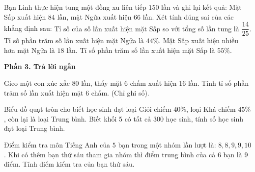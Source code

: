 \begin{ex} %
Bạn Linh thực hiện tung một đồng xu liên tiếp $150$ lần và ghi lại kết quả: Mặt Sấp xuất hiện $84$ lần, mặt Ngửa xuất hiện $66$ lần. Xét tính đúng sai của các khẳng định sau:
\choiceTF
{\True Tỉ số của số lần xuất hiện mặt Sấp so với tổng số lần tung là $\dfrac{14}{25}$.}
{\True Tỉ số phần trăm số lần xuất hiện mặt Ngửa là $44\%$.}
{\True Mặt Sấp xuất hiện nhiều hơn mặt Ngửa là $18$ lần.}
{Tỉ số phần trăm số lần xuất hiện mặt Sấp là $55\%$.}
\end{ex}

\textbf{Phần 3. Trả lời ngắn}

\begin{ex} %
Gieo một con xúc xắc $80$ lần, thấy mặt $6$ chấm xuất hiện $16$ lần. Tính tỉ số phần trăm số lần xuất hiện mặt $6$ chấm. (Chỉ ghi số).
\end{ex}

\begin{ex} %
Biểu đồ quạt tròn cho biết học sinh đạt loại Giỏi chiếm $40\%$, loại Khá chiếm $45\%$, còn lại là loại Trung bình. Biết khối 5 có tất cả $300$ học sinh, tính số học sinh đạt loại Trung bình.
\end{ex}

\begin{ex} %
Điểm kiểm tra môn Tiếng Anh của $5$ bạn trong một nhóm lần lượt là: $8, 8, 9, 9, 10$. Khi có thêm bạn thứ sáu tham gia nhóm thì điểm trung bình của cả $6$ bạn là $9$ điểm. Tính điểm kiểm tra của bạn thứ sáu.
\end{ex}

